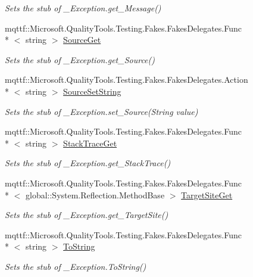 \begin{DoxyCompactItemize}
\begin{DoxyCompactList}\small\item\em Sets the stub of \-\_\-\-Exception.\-get\-\_\-\-Message()\end{DoxyCompactList}\item 
mqttf\-::\-Microsoft.\-Quality\-Tools.\-Testing.\-Fakes.\-Fakes\-Delegates.\-Func\\*
$<$ string $>$ \hyperlink{class_system_1_1_runtime_1_1_interop_services_1_1_fakes_1_1_stub___exception_aba9a887008eb6804dcb4aef75fdbf97d}{Source\-Get}
\begin{DoxyCompactList}\small\item\em Sets the stub of \-\_\-\-Exception.\-get\-\_\-\-Source()\end{DoxyCompactList}\item 
mqttf\-::\-Microsoft.\-Quality\-Tools.\-Testing.\-Fakes.\-Fakes\-Delegates.\-Action\\*
$<$ string $>$ \hyperlink{class_system_1_1_runtime_1_1_interop_services_1_1_fakes_1_1_stub___exception_a577971498f4722837d5629857de2add9}{Source\-Set\-String}
\begin{DoxyCompactList}\small\item\em Sets the stub of \-\_\-\-Exception.\-set\-\_\-\-Source(\-String value)\end{DoxyCompactList}\item 
mqttf\-::\-Microsoft.\-Quality\-Tools.\-Testing.\-Fakes.\-Fakes\-Delegates.\-Func\\*
$<$ string $>$ \hyperlink{class_system_1_1_runtime_1_1_interop_services_1_1_fakes_1_1_stub___exception_ae36b660ff59e6111afd8f9f19c63b9fb}{Stack\-Trace\-Get}
\begin{DoxyCompactList}\small\item\em Sets the stub of \-\_\-\-Exception.\-get\-\_\-\-Stack\-Trace()\end{DoxyCompactList}\item 
mqttf\-::\-Microsoft.\-Quality\-Tools.\-Testing.\-Fakes.\-Fakes\-Delegates.\-Func\\*
$<$ global\-::\-System.\-Reflection.\-Method\-Base $>$ \hyperlink{class_system_1_1_runtime_1_1_interop_services_1_1_fakes_1_1_stub___exception_aeb8e5192a32562c1e3f1bbf1cb7d8444}{Target\-Site\-Get}
\begin{DoxyCompactList}\small\item\em Sets the stub of \-\_\-\-Exception.\-get\-\_\-\-Target\-Site()\end{DoxyCompactList}\item 
mqttf\-::\-Microsoft.\-Quality\-Tools.\-Testing.\-Fakes.\-Fakes\-Delegates.\-Func\\*
$<$ string $>$ \hyperlink{class_system_1_1_runtime_1_1_interop_services_1_1_fakes_1_1_stub___exception_a8cc07d2b0de9554acad2800cfdb2bef3}{To\-String}
\begin{DoxyCompactList}\small\item\em Sets the stub of \-\_\-\-Exception.\-To\-String()\end{DoxyCompactList}\end{DoxyCompactItemize}


